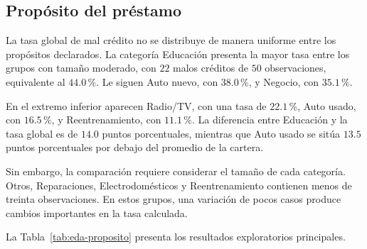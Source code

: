 \subsection{Propósito del préstamo}

La tasa global de mal crédito no se distribuye de manera uniforme entre
los propósitos declarados. La categoría Educación presenta la mayor tasa
entre los grupos con tamaño moderado, con \(22\) malos créditos de
\(50\) observaciones, equivalente al \(44.0\,\%\). Le siguen Auto nuevo,
con \(38.0\,\%\), y Negocio, con \(35.1\,\%\).

En el extremo inferior aparecen Radio/TV, con una tasa de
\(22.1\,\%\), Auto usado, con \(16.5\,\%\), y Reentrenamiento, con
\(11.1\,\%\). La diferencia entre Educación y la tasa global es de
\(14.0\) puntos porcentuales, mientras que Auto usado se sitúa
\(13.5\) puntos porcentuales por debajo del promedio de la cartera.

Sin embargo, la comparación requiere considerar el tamaño de cada
categoría. Otros, Reparaciones, Electrodomésticos y Reentrenamiento
contienen menos de treinta observaciones. En estos grupos, una variación
de pocos casos produce cambios importantes en la tasa calculada.

La Tabla~\ref{tab:eda-proposito} presenta los resultados exploratorios
principales.

